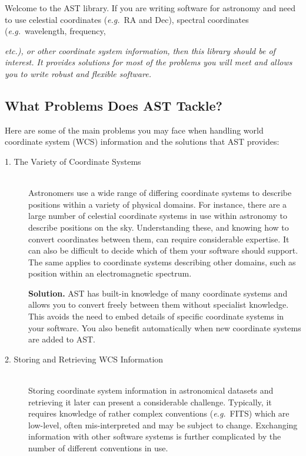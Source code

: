 \documentclass[twoside,11pt]{article}
\begin{document}
Welcome to the AST library. If you are writing software for astronomy
and need to use celestial coordinates ({\em{e.g.}}\ RA and Dec), spectral
coordinates ({\em{e.g.}}\ wavelength, frequency, {\em{etc.}), or
other coordinate system information, then this library should be of
interest. It provides solutions for most of the problems you will meet
and allows you to write robust and flexible software.


\subsection{What Problems Does AST Tackle?}

Here are some of the main problems you may face when handling world
coordinate system (WCS) information and the solutions that AST
provides:

\begin{description}
\item[1. The Variety of Coordinate Systems]\mbox{}\\
Astronomers use a wide range of differing coordinate systems to describe
positions within a variety of physical domains. For instance, there are a 
large number of celestial coordinate systems in use within astronomy to
describe positions on the sky. Understanding these, and knowing how to 
convert coordinates between them, can require considerable expertise. It 
can also be difficult to decide which of them your software should support.
The same applies to coordinate systems describing other domains, such as
position within an electromagnetic spectrum.

{\bf{Solution.}} AST has built-in knowledge of many coordinate systems
and allows you to convert freely between them without specialist
knowledge. This avoids the need to embed details of specific
coordinate systems in your software. You also benefit automatically
when new coordinate systems are added to AST.

\item[2. Storing and Retrieving WCS Information]\mbox{}\\
Storing coordinate system information in astronomical datasets and
retrieving it later can present a considerable challenge. Typically,
it requires knowledge of rather complex conventions
({\em{e.g.}}\ FITS) which are low-level, often mis-interpreted and may
be subject to change. Exchanging information with other software
systems is further complicated by the number of different conventions
in use.


\end{description}}
\end{document}

